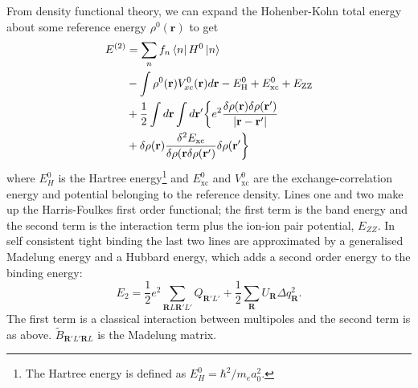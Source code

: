 \documentclass{article}
\begin{document}
\begin{multicols}{2}
From density functional theory, we can expand the Hohenber-Kohn total energy \cite{Kohn1964} about some reference energy $\rho^{0}(\textbf{r})$ \cite{elstner1998self} to get 
\begin{equation}
	\begin{split}
		E^{(2)}&=\sum_{n}f_{n}\bra{n}H^{0}\ket{n} \\
		&-\int \rho^{0} (\textbf{r}) V^{0}_{xc} (\textbf{r}) d\textbf{r} - E^{0}_{\text{H}} + E^{0}_{\text{xc}} +E_{\text{ZZ}} \\
		&+\frac{1}{2}\int d\textbf{r}\int d\textbf{r}'\bigg \{e^{2}\frac{\delta\rho(\textbf{r})\delta\rho(\textbf{r}')}{|\textbf{r}-\textbf{r}'|} \\
		& +\delta\rho(\textbf{r})\frac{\delta^{2}E_{\text{xc}}}{\delta\rho(\textbf{r}\delta\rho(\textbf{r}')}\delta\rho(\textbf{r}'\bigg\}
	\end{split}
\end{equation} 
where $E^{0}_{H}$ is the Hartree energy\footnote{The Hartree energy is defined as $E^{0}_{H}=\hbar^{2}/m_{e}a^{2}_{0}$.} and $E^{0}_{\text{xc}}$ and $V^{0}_{\text{xc}}$ are the exchange-correlation energy and potential belonging to the reference density. Lines one and two make up the Harris-Foulkes first order functional;\cite{Harris1985} the first term is the band energy and the second term is the interaction term plus the ion-ion pair potential, $E_{ZZ}$. In self consistent tight binding the last two lines are approximated by a generalised Madelung energy \cite{Madelung1919} and a Hubbard energy,\cite{Hubbard1963} which adds a second order energy to the binding energy:
\begin{equation}
\label{eq:Electrostatic}
	E_{2}=\frac{1}{2}e^{2}\sum_{\textbf{R}L\textbf{R}'L'}Q_{\textbf{R}'L'}+\frac{1}{2}\sum_{\textbf{R}}U_{\textbf{R}}\Delta q^{2}_{\textbf{R}}.
\end{equation}
The first term is a classical interaction between multipoles and the second term is as above. $\tilde{B}_{\textbf{R}'L'\textbf{R}L}$ is the Madelung matrix.


\end{multicols}
\end{document}
